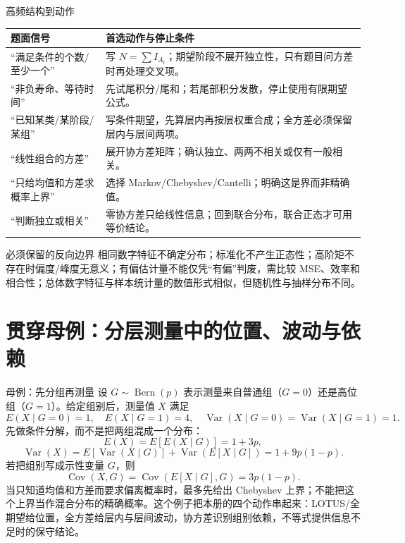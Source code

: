 \documentclass[11pt,a4paper]{ctexart}
\begin{document}
\begin{methodbox}{高频结构到动作}
\begin{tabularx}{\linewidth}{L{4.3cm}Y}
\toprule
题面信号 & 首选动作与停止条件\\
\midrule
“满足条件的个数/至少一个” & 写 $N=\sum I_{A_i}$；期望阶段不展开独立性，只有题目问方差时再处理交叉项。\\
“非负寿命、等待时间” & 先试尾积分/尾和；若尾部积分发散，停止使用有限期望公式。\\
“已知某类/某阶段/某组” & 写条件期望，先算层内再按层权重合成；全方差必须保留层内与层间两项。\\
“线性组合的方差” & 展开协方差矩阵；确认独立、两两不相关或仅有一般相关。\\
“只给均值和方差求概率上界” & 选择 Markov/Chebyshev/Cantelli；明确这是界而非精确值。\\
“判断独立或相关” & 零协方差只给线性信息；回到联合分布，联合正态才可用等价结论。\\
\bottomrule
\end{tabularx}
\end{methodbox}

\begin{warnbox}{必须保留的反向边界}
相同数字特征不确定分布；标准化不产生正态性；高阶矩不存在时偏度/峰度无意义；有偏估计量不能仅凭“有偏”判废，需比较 MSE、效率和相合性；总体数字特征与样本统计量的数值形式相似，但随机性与抽样分布不同。
\end{warnbox}

\section{贯穿母例：分层测量中的位置、波动与依赖}

\begin{examplebox}{母例：先分组再测量}
设 $G\sim\operatorname{Bern}(p)$ 表示测量来自普通组（$G=0$）还是高位组（$G=1$）。给定组别后，测量值 $X$ 满足
\[
E(X\mid G=0)=1,\quad E(X\mid G=1)=4,\quad
\operatorname{Var}(X\mid G=0)=\operatorname{Var}(X\mid G=1)=1.
\]
先做条件分解，而不是把两组混成一个分布：
\[
E(X)=E[E(X\mid G)]=1+3p,
\]
\[
\operatorname{Var}(X)=E[\operatorname{Var}(X\mid G)]
 +\operatorname{Var}(E[X\mid G])
 =1+9p(1-p).
\]
若把组别写成示性变量 $G$，则
\[
\operatorname{Cov}(X,G)=\operatorname{Cov}(E[X\mid G],G)=3p(1-p).
\]
当只知道均值和方差而要求偏离概率时，最多先给出 Chebyshev 上界；不能把这个上界当作混合分布的精确概率。这个例子把本册的四个动作串起来：LOTUS/全期望给位置，全方差给层内与层间波动，协方差识别组别依赖，不等式提供信息不足时的保守结论。
\end{examplebox}
\end{document}
